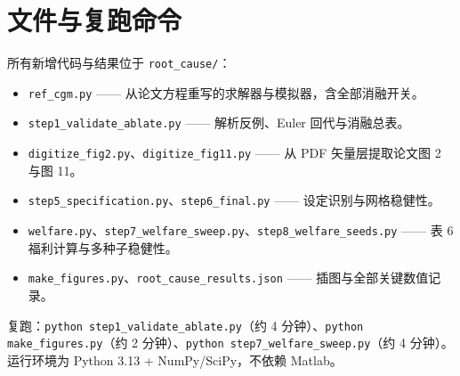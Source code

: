 \documentclass[UTF8,a4paper,11pt,fontset=fandol]{ctexart}
\begin{document}
\section{文件与复跑命令}
所有新增代码与结果位于 \texttt{root\_cause/}：
\begin{itemize}[leftmargin=1.6em,itemsep=1pt]
\item \texttt{ref\_cgm.py} —— 从论文方程重写的求解器与模拟器，含全部消融开关。
\item \texttt{step1\_validate\_ablate.py} —— 解析反例、Euler 回代与消融总表。
\item \texttt{digitize\_fig2.py}、\texttt{digitize\_fig11.py} —— 从 PDF 矢量层提取论文图 2 与图 11。
\item \texttt{step5\_specification.py}、\texttt{step6\_final.py} —— 设定识别与网格稳健性。
\item \texttt{welfare.py}、\texttt{step7\_welfare\_sweep.py}、\texttt{step8\_welfare\_seeds.py} —— 表 6 福利计算与多种子稳健性。
\item \texttt{make\_figures.py}、\texttt{root\_cause\_results.json} —— 插图与全部关键数值记录。
\end{itemize}
复跑：\texttt{python step1\_validate\_ablate.py}（约 4 分钟）、\texttt{python make\_figures.py}（约 2 分钟）、\texttt{python step7\_welfare\_sweep.py}（约 4 分钟）。运行环境为 Python 3.13 + NumPy/SciPy，不依赖 Matlab。
\end{document}
